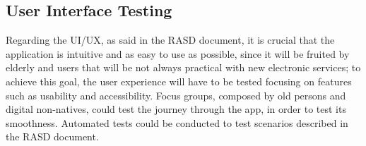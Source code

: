 \subsection{User Interface Testing}
Regarding the UI/UX, as said in the RASD document, it is crucial that the application is intuitive and as easy to use as possible, since it will be fruited by elderly and users that will be not always practical with new electronic services; to achieve this goal, the user experience will have to be tested focusing on features such as usability and accessibility. Focus groups, composed by old persons and digital non-natives, could test the journey through the app, in order to test its smoothness. Automated tests could be conducted to test scenarios described in the RASD document.